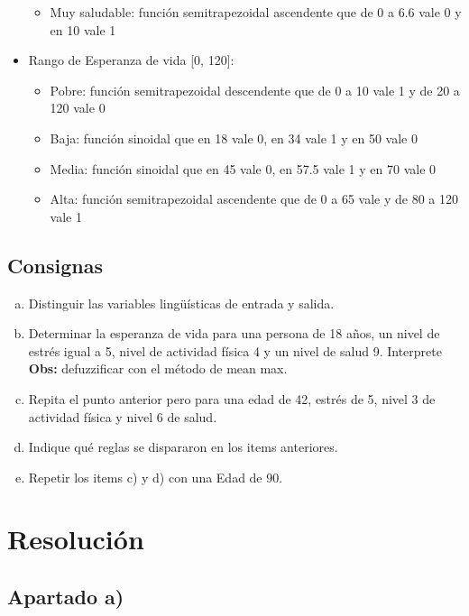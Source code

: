 \documentclass[11pt]{article}
\begin{document}
\begin{itemize}
\begin{itemize}
            \item Muy saludable: función semitrapezoidal ascendente que de 0 a 6.6 vale 0 y en 10 vale 1
        \end{itemize}
    \item Rango de Esperanza de vida [0, 120]:
    \begin{itemize}
        \item Pobre: función semitrapezoidal descendente que de 0 a 10 vale 1 y de 20 a 120 vale 0
        \item Baja: función sinoidal que en 18 vale 0, en 34 vale 1 y en 50 vale 0
        \item Media: función sinoidal que en 45 vale 0, en 57.5 vale 1 y en 70 vale 0
        \item Alta: función semitrapezoidal ascendente que de 0 a 65 vale y de 80 a 120 vale 1
    \end{itemize}
\end{itemize}


\subsection*{Consignas}

\begin{enumerate}[a)]
    \item Distinguir las variables lingüísticas de entrada y salida.
    \item Determinar la esperanza de vida para una persona de 18 años, un nivel de estrés
          igual a 5, nivel de actividad física 4 y un nivel de salud 9. Interprete \\
    \textbf{Obs:} defuzzificar con el método de mean max. 
    \item Repita el punto anterior pero para una edad de 42, estrés de 5, nivel 3
          de actividad física y nivel 6 de salud.
    \item Indique qué reglas se dispararon en los items anteriores.
    \item Repetir los items c) y d) con una Edad de 90.
\end{enumerate}

\newpage

\section{Resolución}

\subsection*{Apartado a)}
\end{document}
